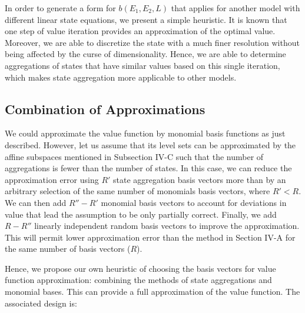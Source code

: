 \documentclass[conference]{IEEEtran}
\begin{document}
	In order to generate a form for $b(E_{1},E_{2},L)$ that applies for another model with different linear state equations, we present a simple heuristic. It is known that one step of value iteration provides an approximation of the optimal value. Moreover, we are able to discretize the state with a much finer resolution without being affected by the curse of dimensionality. Hence, we are able to determine aggregations of states that have similar values based on this single iteration, which makes state aggregation more applicable to other models.
    

\subsection{Combination of Approximations}
    
    We could approximate the value function by monomial basis functions as just described. However, let us assume that its level sets can be approximated by the affine subspaces mentioned in Subsection IV-C such that the number of aggregations is fewer than the number of states. In this case, we can reduce the approximation error using $R'$ state aggregation basis vectors more than by an arbitrary selection of the same number of monomials basis vectors, where $R'<R$. We can then add $R''-R'$ monomial basis vectors to account for deviations in value that lead the assumption to be only partially correct. Finally, we add $R-R''$ linearly independent random basis vectors to improve the approximation. This will permit lower approximation error than the method in Section IV-A for the same number of basis vectors ($R$).
    
    
    Hence, we propose our own heuristic of choosing the basis vectors for value function approximation: combining the methods of state aggregations and monomial bases. This can provide a full approximation of the value function. The associated design is:
    
\end{document}
